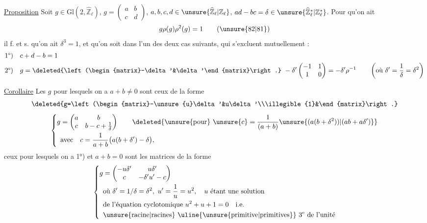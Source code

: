 
\uline{Proposition} Soit $g\in\mathrm{Gl}(2,\widehat{\mathbb Z}_\ell)$, $g=\begin{pmatrix}a&b\\c&d\end{pmatrix}$, $a,b,c,d\in\unsure{\widehat{\mathbb Z}_\ell|\mathbb Z_\ell}$,
$ad-bc=\delta\in\unsure{\widehat{\mathbb Z}_\ell^{*}|\mathbb Z_\ell^{*}}$. Pour qu'on ait
\[
g\rho(g)\rho^2(g)=1\qquad(\unsure{82|81})
\]
il f. et s. qu'on ait $\delta^3=1$, et qu'on soit dans l'un des deux cas suivants, qui s'excluent mutuellement :
\[
\begin{aligned}
1\text{°)}\quad&c+d-b=1\\
2\text{°)}\quad&g=\deleted{\left(\begin{matrix}-\delta'&\delta'\end{matrix}\right.}\ -\delta'\begin{pmatrix}-1&1\\1&0\end{pmatrix}=-\delta'\rho^{-1}\qquad\left(\text{où }\delta'=\frac1\delta=\delta^2\right)
\end{aligned}
\]


\uline{Corollaire} Les $g$ pour lesquels on a   $a+b\ne0$ sont ceux de la forme
\[
\deleted{g=\left(\begin{matrix}-\unsure{u}\delta'&u\delta'\\\illegible{1}&\end{matrix}\right.}
\]
\[
\left\{\begin{aligned}
g&=\begin{pmatrix}a&b\\c&b-c+\frac1\delta\end{pmatrix}\qquad\deleted{\unsure{\text{pour}}\ \unsure{c}=\frac1{(a+b)}\unsure{(a(b+\delta^2))|(ab+a\delta')}}\\
&\text{avec}\quad c=\frac1{a+b}\bigl(a(b+\delta')-\delta\bigr),
\end{aligned}\right.
\]
ceux pour lesquels on a 1°) et $a+b=0$ sont  les matrices de la forme
\[
\left\{\begin{aligned}
g&=\begin{pmatrix}-u\delta'&u\delta'\\c&-\delta'u'-c\end{pmatrix}\\
&\text{où }\delta'=1/\delta=\delta^2,\ u'=\frac1u=u^2,\quad u\text{ étant une solution}\\
&\text{de l'équation cyclotomique }u^2+u+1=0\quad\text{i.e.}\\
&\text{\unsure{racine|racines} \uline{\unsure{primitive|primitives}} }3^{\mathrm e}\text{ de l'unité}
\end{aligned}\right.
\]
